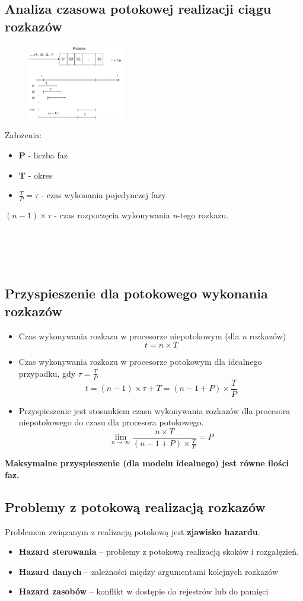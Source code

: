    	\subsection{Analiza czasowa potokowej realizacji ciągu rozkazów}
	   	\begin{figure}
	   		\includegraphics[width=0.38\textwidth]{./images/potok03}
	   	\end{figure}
   		Założenia:
	   	\begin{itemize}
	   		\item \textbf{P} - liczba faz
	   		\item \textbf{T} - okres
	   		\item $\frac{T}{P}=\tau $ - czas wykonania pojedynczej fazy
	   	\end{itemize}
   		$(n-1)\times\tau$ - czas rozpoczęcia wykonywania \emph{n}-tego rozkazu.\\\\\\\\\\
   	\subsection{Przyspieszenie dla potokowego wykonania rozkazów}
	   	\begin{itemize}
	   		\item Czas wykonywania rozkazu w procesorze niepotokowym (dla \emph{n} rozkazów)
	   		$$t=n\times T$$
	   		\item Czas wykonywania rozkazu w procesorze potokowym dla idealnego przypadku, gdy $\tau=\frac{T}{P}$\\
	   		$$t=(n-1)\times\tau+T=(n-1+P)\times\frac{T}{P}$$
	   		\item Przyspieszenie jest stosunkiem czasu wykonywania rozkazów dla procesora niepotokowego do czasu dla procesora potokowego.
	   		$$\lim_{n \to \infty}\frac{n\times T}{(n-1+P)\times\frac{T}{P}}=P$$
	   	\end{itemize}
	   \textbf{	Maksymalne przyspieszenie (dla modelu idealnego) jest równe ilości faz.}
   	\subsection{Problemy z potokową realizacją rozkazów}
   		Problemem związanym z realizacją potokową jest \textbf{zjawisko hazardu}.
	   	\begin{itemize}
	   		\item \textbf{Hazard sterowania }– problemy z potokową realizacją skoków i rozgałęzień.
	   		\item \textbf{Hazard danych} – zależności między argumentami kolejnych rozkazów
	   		\item \textbf{Hazard zasobów} – konflikt w dostępie do rejestrów lub do pamięci
	   	\end{itemize}
